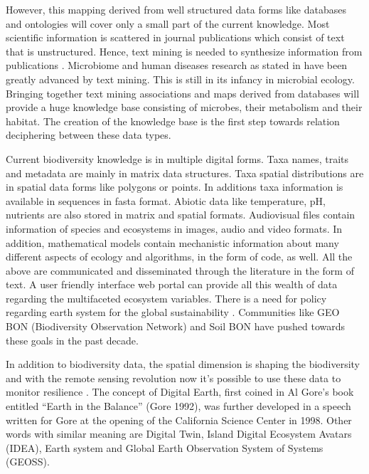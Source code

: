 However, this mapping derived from well structured data forms like databases
and ontologies will cover only a small part of the current knowledge. Most
scientific information is scattered in journal publications which consist of
text that is unstructured. Hence, text mining is needed to synthesize
information from publications \parencite{jensen2006Literature}. Microbiome and
human diseases research as stated in \parencite{badal2019Challenges} have been
greatly advanced by text mining. This is still in its infancy in microbial
ecology. Bringing together text mining associations and maps derived from
databases will provide a huge knowledge base consisting of microbes, their
metabolism and their habitat. The creation of the knowledge base is the first
step towards relation deciphering between these data types.

Current biodiversity knowledge is in multiple digital forms. 
Taxa names, traits and metadata are mainly in matrix data
structures. Taxa spatial distributions are in spatial data
forms like polygons or points. In additions taxa information
is available in sequences in fasta format. Abiotic data like 
temperature, pH, nutrients are also stored in matrix
and spatial formats. Audiovisual files contain information
of species and ecosystems in images, audio and video formats.
In addition, mathematical models contain mechanistic information
about many different aspects of ecology and algorithms, in the 
form of code, as well. All the above are communicated and disseminated through the
literature in the form of text. A user friendly interface web portal can provide all this wealth of data
regarding the multifaceted ecosystem variables. There is a need for policy regarding earth system for the global
sustainability \parencite{reid2010earth}. Communities like GEO BON (Biodiversity Observation Network) and Soil BON
have pushed towards these goals in the past decade.

In addition to biodiversity data, the spatial dimension is shaping the biodiversity and with the remote sensing revolution now
it's possible to use these data to monitor resilience \parencite{Lenton2022resilience}. 
The concept of Digital Earth, first coined in Al Gore’s book entitled 
“Earth in the Balance” (Gore 1992), was further developed in a speech
written for Gore at the opening of the California Science Center in 1998. Other words with
similar meaning are Digital Twin, Island Digital Ecosystem Avatars (IDEA), Earth system
and Global Earth Observation System of Systems (GEOSS).

